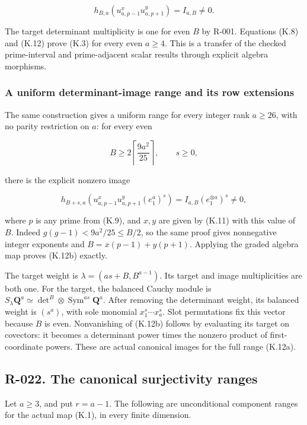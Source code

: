 \documentclass[
  10pt,
]{article}
\begin{document}
\[
\boxed{
h_{B,a}(u_{a,p-1}^{x}u_{a,p+1}^{y})=I_{a,B}\ne0.}
\tag{K.12}
\]

The target determinant multiplicity is one for even \(B\) by R-001.
Equations (K.8) and (K.12) prove (K.3) for every even \(a\ge4\). This is
a transfer of the checked prime-interval and prime-adjacent scalar
results through explicit algebra morphisms.

\subsubsection{A uniform determinant-image range and its row
extensions}\label{a-uniform-determinant-image-range-and-its-row-extensions}

The same construction gives a uniform range for every integer rank
\(a\ge26\), with no parity restriction on \(a\): for every even

\[
B\ge2\left\lceil\frac{9a^2}{25}\right\rceil,
\qquad s\ge0,
\tag{K.12a}
\]

there is the explicit nonzero image

\[
\boxed{
h_{B+s,a}\left(u_{a,p-1}^{x}u_{a,p+1}^{y}(e_1^a)^s\right)
=I_{a,B}(e_1^{\otimes a})^s\ne0,}
\tag{K.12b}
\]

where \(p\) is any prime from (K.9), and \(x,y\) are given by (K.11)
with this value of \(B\). Indeed \(g(g-1)<9a^2/25\le B/2\), so the same
proof gives nonnegative integer exponents and \(B=x(p-1)+y(p+1)\).
Applying the graded algebra map proves (K.12b) exactly.

The target weight is \(\lambda=(as+B,B^{a-1})\). Its target and image
multiplicities are both one. For the target, the balanced Cauchy module
is \(S_\lambda\mathbf Q^a\simeq\det^B\otimes
\operatorname{Sym}^{as}\mathbf Q^a\). After removing the determinant
weight, its balanced weight is \((s^a)\), with sole monomial
\(x_1^s\cdots x_a^s\). Slot permutations fix this vector because \(B\)
is even. Nonvanishing of (K.12b) follows by evaluating its target on
covectors: it becomes a determinant power times the nonzero product of
first-coordinate powers. These are actual canonical images for the full
range (K.12a).

\subsection{R-022. The canonical surjectivity
ranges}\label{r-022.-the-canonical-surjectivity-ranges}

Let \(a\ge3\), and put \(r=a-1\). The following are unconditional
component ranges for the actual map (K.1), in every finite dimension.
\end{document}
